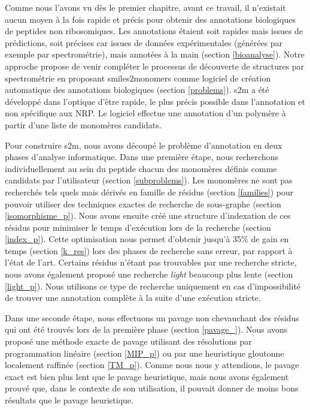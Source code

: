 Comme nous l'avons vu dès le premier chapitre, avant ce travail, il n'existait aucun moyen à la fois rapide et précis pour obtenir des annotations biologiques de peptides non ribosomiques.
Les annotations étaient soit rapides mais issues de prédictions, soit précises car issues de données expérimentales (générées par exemple par spectrométrie), mais annotées à la main (section \ref{bioanalyse}).
Notre approche propose de venir compléter le processus de découverte de structures par spectrométrie en proposant smiles2monomers comme logiciel de création automatique des annotations biologiques (section \ref{problems}).
s2m a été développé dans l'optique d'être rapide, le plus précis possible dans l'annotation et non spécifique aux NRP.
Le logiciel effectue une annotation d'un polymère à partir d'une liste de monomères candidats.

Pour construire s2m, nous avons découpé le problème d'annotation en deux phases d'analyse informatique.
Dans une première étape, nous recherchons individuellement au sein du peptide chacun des monomères définis comme candidats par l'utilisateur (section \ref{subproblems}).
Les monomères ne sont pas recherchés tels quels mais dérivés en famille de résidus (section \ref{families}) pour pouvoir utiliser des techniques exactes de recherche de sous-graphe (section \ref{isomorphisme_p}).
Nous avons ensuite créé une structure d'indexation de ces résidus pour minimiser le temps d'exécution lors de la recherche (section \ref{index_p}).
Cette optimisation nous permet d'obtenir jusqu'à 35\% de gain en temps (section \ref{k_res}) lors des phases de recherche sans erreur, par rapport à l'état de l'art.
Certains résidus n'étant pas trouvables par une recherche stricte, nous avons également proposé une recherche \textit{light} beaucoup plus lente (section \ref{light_p}). Nous utilisons ce type de recherche uniquement en cas d'impossibilité de trouver une annotation complète à la suite d'une exécution stricte.

Dans une seconde étape, nous effectuons un pavage non chevauchant des résidus qui ont été trouvés lors de la première phase (section \ref{pavage_}).
Nous avons proposé une méthode exacte de pavage utilisant des résolutions par programmation linéaire (section \ref{MIP_p}) ou par une heuristique gloutonne localement raffinée (section \ref{TM_p}).
Comme nous nous y attendions, le pavage exact est bien plus lent que le pavage heuristique, mais nous avons également prouvé que, dans le contexte de son utilisation, il pouvait donner de moins bons résultats que le pavage heuristique.

